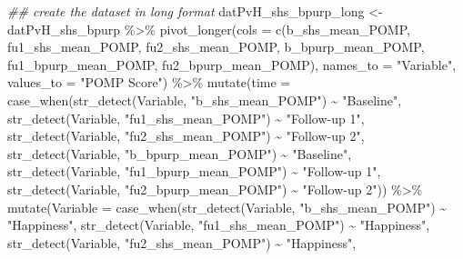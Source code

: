 \documentclass[
  letterpaper,
  DIV=11,
  numbers=noendperiod]{scrartcl}
\newenvironment{Shaded}{\begin{snugshade}}{\end{snugshade}}
\newcommand{\AttributeTok}[1]{\textcolor[rgb]{0.40,0.45,0.13}{#1}}
\newcommand{\DocumentationTok}[1]{\textcolor[rgb]{0.37,0.37,0.37}{\textit{#1}}}
\newcommand{\FunctionTok}[1]{\textcolor[rgb]{0.28,0.35,0.67}{#1}}
\newcommand{\NormalTok}[1]{\textcolor[rgb]{0.00,0.23,0.31}{#1}}
\newcommand{\OtherTok}[1]{\textcolor[rgb]{0.00,0.23,0.31}{#1}}
\newcommand{\SpecialCharTok}[1]{\textcolor[rgb]{0.37,0.37,0.37}{#1}}
\newcommand{\StringTok}[1]{\textcolor[rgb]{0.13,0.47,0.30}{#1}}
\begin{document}
\begin{Shaded}
\begin{Highlighting}[]
\DocumentationTok{\#\# create the dataset in long format}
\NormalTok{datPvH\_shs\_bpurp\_long }\OtherTok{\textless{}{-}}\NormalTok{ datPvH\_shs\_bpurp }\SpecialCharTok{\%\textgreater{}\%} 
  \FunctionTok{pivot\_longer}\NormalTok{(}\AttributeTok{cols =} \FunctionTok{c}\NormalTok{(b\_shs\_mean\_POMP, }
\NormalTok{                        fu1\_shs\_mean\_POMP, }
\NormalTok{                        fu2\_shs\_mean\_POMP, }
\NormalTok{                        b\_bpurp\_mean\_POMP, }
\NormalTok{                        fu1\_bpurp\_mean\_POMP, }
\NormalTok{                        fu2\_bpurp\_mean\_POMP),}
               \AttributeTok{names\_to =} \StringTok{"Variable"}\NormalTok{,}
               \AttributeTok{values\_to =} \StringTok{"POMP Score"}\NormalTok{) }\SpecialCharTok{\%\textgreater{}\%} 
  \FunctionTok{mutate}\NormalTok{(}\AttributeTok{time =} \FunctionTok{case\_when}\NormalTok{(}\FunctionTok{str\_detect}\NormalTok{(Variable, }\StringTok{"b\_shs\_mean\_POMP"}\NormalTok{) }\SpecialCharTok{\textasciitilde{}} \StringTok{"Baseline"}\NormalTok{,}
                          \FunctionTok{str\_detect}\NormalTok{(Variable, }\StringTok{"fu1\_shs\_mean\_POMP"}\NormalTok{) }\SpecialCharTok{\textasciitilde{}} \StringTok{"Follow{-}up 1"}\NormalTok{,}
                          \FunctionTok{str\_detect}\NormalTok{(Variable, }\StringTok{"fu2\_shs\_mean\_POMP"}\NormalTok{) }\SpecialCharTok{\textasciitilde{}} \StringTok{"Follow{-}up 2"}\NormalTok{,}
                          \FunctionTok{str\_detect}\NormalTok{(Variable, }\StringTok{"b\_bpurp\_mean\_POMP"}\NormalTok{) }\SpecialCharTok{\textasciitilde{}} \StringTok{"Baseline"}\NormalTok{,}
                          \FunctionTok{str\_detect}\NormalTok{(Variable, }\StringTok{"fu1\_bpurp\_mean\_POMP"}\NormalTok{) }\SpecialCharTok{\textasciitilde{}} \StringTok{"Follow{-}up 1"}\NormalTok{,}
                          \FunctionTok{str\_detect}\NormalTok{(Variable, }\StringTok{"fu2\_bpurp\_mean\_POMP"}\NormalTok{) }\SpecialCharTok{\textasciitilde{}} \StringTok{"Follow{-}up 2"}\NormalTok{)) }\SpecialCharTok{\%\textgreater{}\%}
  \FunctionTok{mutate}\NormalTok{(}\AttributeTok{Variable =} \FunctionTok{case\_when}\NormalTok{(}\FunctionTok{str\_detect}\NormalTok{(Variable, }\StringTok{"b\_shs\_mean\_POMP"}\NormalTok{) }\SpecialCharTok{\textasciitilde{}} \StringTok{"Happiness"}\NormalTok{,}
                              \FunctionTok{str\_detect}\NormalTok{(Variable, }\StringTok{"fu1\_shs\_mean\_POMP"}\NormalTok{) }\SpecialCharTok{\textasciitilde{}} \StringTok{"Happiness"}\NormalTok{,}
                              \FunctionTok{str\_detect}\NormalTok{(Variable, }\StringTok{"fu2\_shs\_mean\_POMP"}\NormalTok{) }\SpecialCharTok{\textasciitilde{}} \StringTok{"Happiness"}\NormalTok{,}

\end{Highlighting}
\end{Shaded}
\end{document}
